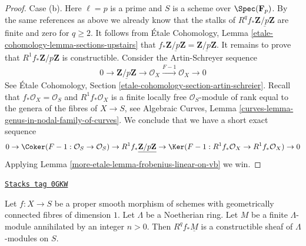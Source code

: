 \begin{proof}
\medskip\noindent
Case (b). Here $\ell = p$ is a prime and $S$ is a scheme over
$\Spec(\mathbf{F}_p)$. By the same references as above we already
know that the stalks of $R^qf_*\underline{\mathbf{Z}/p\mathbf{Z}}$
are finite and zero for $q \geq 2$. It follows from
\'Etale Cohomology, Lemma \ref{etale-cohomology-lemma-sections-upstairs}
that $f_*\underline{\mathbf{Z}/p\mathbf{Z}} =
\underline{\mathbf{Z}/p\mathbf{Z}}$. It remains to prove
that $R^1f_*\underline{\mathbf{Z}/p\mathbf{Z}}$ is constructible.
Consider the Artin-Schreyer sequence
$$
0 \to \underline{\mathbf{Z}/p\mathbf{Z}} \to \mathcal{O}_X
\xrightarrow{F - 1} \mathcal{O}_X
\to 0
$$
See \'Etale Cohomology, Section \ref{etale-cohomology-section-artin-schreier}.
Recall that $f_*\mathcal{O}_X = \mathcal{O}_S$ and
$R^1f_*\mathcal{O}_X$ is a finite locally free $\mathcal{O}_S$-module
of rank equal to the genera of the fibres of $X \to S$, see
Algebraic Curves, Lemma \ref{curves-lemma-genus-in-nodal-family-of-curves}.
We conclude that we have a short exact sequence
$$
0 \to
\Coker(F - 1 : \mathcal{O}_S \to \mathcal{O}_S)
\to R^1f_*\underline{\mathbf{Z}/p\mathbf{Z}} \to
\Ker(F - 1 : R^1f_*\mathcal{O}_X \to R^1f_*\mathcal{O}_X)
\to 0
$$
Applying Lemma \ref{more-etale-lemma-frobenius-linear-on-vb} we win.
\end{proof}

\begin{lemma}
\label{more-etale-lemma-proper-smooth-family-curves-modules}
\href{https://stacks.math.columbia.edu/tag/0GKW}{\texttt{Stacks tag 0GKW}}

Let $f : X \to S$ be a proper smooth morphism of schemes with
geometrically connected fibres of dimension $1$. Let $\Lambda$
be a Noetherian ring. Let $M$ be a finite $\Lambda$-module
annihilated by an integer $n > 0$. Then $R^qf_*\underline{M}$
is a constructible sheaf of $\Lambda$-modules on $S$.
\end{lemma}

